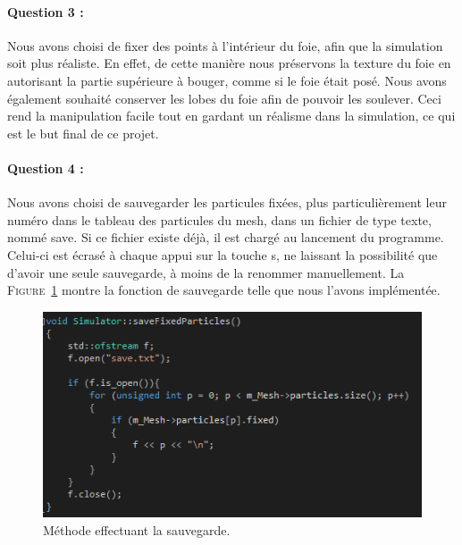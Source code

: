 \documentclass[a4paper,12pt]{article}
\begin{document}
\paragraph{Question 3 :} Nous avons choisi de fixer des points à l'intérieur du foie, afin que la simulation soit plus réaliste. En effet, de cette manière nous préservons la \og{}texture\fg{} du foie en autorisant la partie supérieure à bouger, comme si le foie était posé. Nous avons également souhaité conserver les lobes du foie afin de pouvoir les soulever. Ceci rend la manipulation facile tout en gardant un réalisme dans la simulation, ce qui est le but final de ce projet.

\paragraph{Question 4 :} Nous avons choisi de sauvegarder les particules fixées, plus particulièrement leur numéro dans le tableau des particules du mesh, dans un fichier de type texte, nommé \og{}save\fg{}. Si ce fichier existe déjà, il est chargé au lancement du programme. Celui-ci est écrasé à chaque appui sur la touche \og{}s\fg{}, ne laissant la possibilité que d'avoir une seule sauvegarde, à moins de la renommer manuellement. La \textsc{Figure}~\ref{fig:save} montre la fonction de sauvegarde telle que nous l'avons implémentée. 
\begin{figure}
  \centering
  \includegraphics{images/save.png}
  \caption{Méthode effectuant la sauvegarde.}
  \label{fig:save}
\end{figure}
\end{document}
